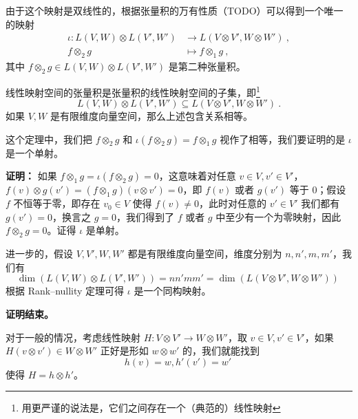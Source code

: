 
由于这个映射是双线性的，根据张量积的万有性质（TODO）可以得到一个唯一的映射
\begin{equation}
\begin{aligned}
\iota: L(V, W) \otimes L(V', W') &\to L(V \otimes V', W \otimes W')~, \\
f \otimes_2 g &\mapsto f \otimes_1 g~,
\end{aligned}
\end{equation}
其中 $f \otimes_2 g \in L(V, W) \otimes L(V', W')$ 是第二种张量积。

\begin{theorem}{}
线性映射空间的张量积是张量积的线性映射空间的子集，即\footnote{用更严谨的说法是，它们之间存在一个（典范的）线性映射}
\begin{equation}
L(V, W) \otimes L(V', W') \subseteq L(V \otimes V', W \otimes W')~.
\end{equation}
如果 $V, W$ 是有限维度向量空间，那么上述包含关系相等。
\end{theorem}

这个定理中，我们把 $f \otimes_2 g$ 和 $\iota(f \otimes_2 g) = f \otimes_1 g$ 视作了相等，我们要证明的是 $\iota$ 是一个单射。

\textbf{证明：}
如果 $f \otimes_1 g = \iota(f \otimes_2 g) = 0$，这意味着对任意 $v \in V, v' \in V'$，$f(v) \otimes g(v') = (f \otimes_1 g)(v \otimes v') = 0$，即 $f(v)$ 或者 $g(v')$ 等于 $0$；假设 $f$ 不恒等于零，即存在 $v_0 \in V$ 使得 $f(v) \neq 0$，此时对任意的 $v' \in V'$ 我们都有 $g(v') = 0$，换言之 $g = 0$，我们得到了 $f$ 或者 $g$ 中至少有一个为零映射，因此 $f \otimes_2 g = 0$。证得 $\iota$ 是单射。

进一步的，假设 $V, V', W, W'$ 都是有限维度向量空间，维度分别为 $n, n', m, m'$，我们有
\begin{equation}
\dim(L(V, W) \otimes L(V', W')) = n n' m m' = \dim(L(V \otimes V', W \otimes W'))~
\end{equation}
根据 Rank–nullity 定理可得 $\iota$ 是一个同构映射。

\textbf{证明结束。}

对于一般的情况，考虑线性映射 $H: V \otimes V' \to W \otimes W'$，取 $v \in V, v' \in V'$，如果 $H(v \otimes v') \in W \otimes W'$ 正好是形如 $w \otimes w'$ 的，我们就能找到
\begin{equation}
h(v) = w, h'(v') = w'~
\end{equation}
使得 $H = h \otimes h'$。

